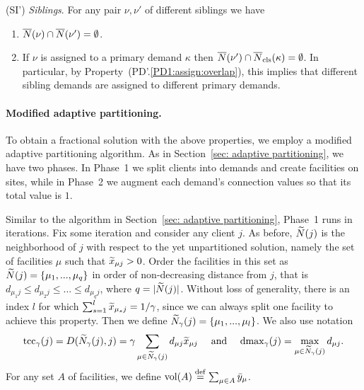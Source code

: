 \begin{description}
\begin{enumerate}
	\end{enumerate}
	
\item{(SI')} \emph{Siblings}. For any pair $\nu,\nu'$ of different siblings we have
  \begin{enumerate}

	\item \label{SI1:siblings disjoint}
		  ${\overline{N}}(\nu)\cap {\overline{N}}(\nu') = \emptyset$.
		
	\item \label{SI1:primary disjoint} If $\nu$ is assigned to a primary demand $\kappa$ then
 		${\overline{N}}(\nu')\cap {\overline{N}}_{\text{cls}}(\kappa) = \emptyset$. In particular, by Property~(PD'.\ref{PD1:assign:overlap}),
		this implies that different sibling demands are assigned to different primary demands.

	\end{enumerate}
	
\end{description}


\paragraph{Modified adaptive partitioning.}
To obtain a fractional solution with the above properties,
we employ a modified adaptive partitioning algorithm. As
in Section~\ref{sec: adaptive partitioning}, we have two phases.
In Phase~1 we split clients into demands and create facilities on
sites, while in Phase~2 we augment each demand's
connection values so that its total value is $1$.

Similar to the algorithm in Section~\ref{sec: adaptive partitioning},
Phase~1 runs in iterations. Fix some iteration and consider any client $j$.  As before,
${\widetilde N}(j)$ is the neighborhood of $j$ with respect to the yet
unpartitioned solution, namely the set of facilities $\mu$ such that
${\widetilde x}_{\mu j}>0$. Order the facilities in this set as
${\widetilde N}(j) = { \left\{ \mu_1,...,\mu_q \right\} }$ in order of non-decreasing
distance from $j$, that is
$d_{\mu_1 j} \leq d_{\mu_2 j} \leq \ldots \leq d_{\mu_q j}$, where
$q = |{\widetilde N}(j)|$. Without loss of generality, there is an index
$l$ for which $\sum_{s=1}^l {\widetilde x}_{\mu_s j} = 1/\gamma$, since we can
always split one facility to achieve this property. Then we define
${\widetilde N}_{\gamma}(j) = { \left\{ \mu_1,...,\mu_l \right\} }$. We also use notation
%
\begin{equation*}
\textrm{tcc}_\gamma(j) =  D({\widetilde N}_\gamma(j), j) = \gamma\sum_{\mu\in{\widetilde N}_{\gamma}(j)} d_{\mu j} {\widetilde x}_{\mu j}
			\quad\textrm{ and }\quad
 \text{dmax}_\gamma(j) = \max_{\mu \in {\widetilde N}_{\gamma}(j)} d_{\mu j}. 
\end{equation*}
For any set $A$ of facilities, we define $\textrm{vol}(A) \stackrel{\mathrm{def}}= \sum_{\mu\in A} {\bar y}_{\mu}$.
%

